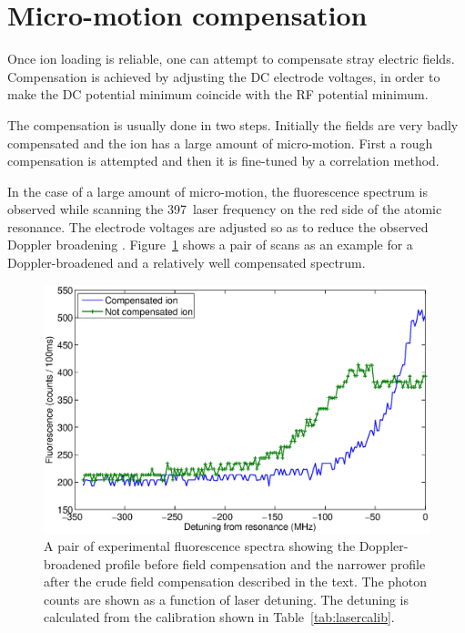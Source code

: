 \section{Micro-motion compensation}
\label{sec:micromotioncomp}

Once ion loading is reliable, one can attempt to compensate stray electric fields. Compensation is achieved by adjusting the DC electrode voltages, in order to make the DC potential minimum coincide with the RF potential minimum. 

The compensation is usually done in two steps. Initially the fields are very badly compensated and the ion has a large amount of micro-motion. First a rough compensation is attempted and then it is fine-tuned by a correlation method.

In the case of a large amount of micro-motion, the fluorescence spectrum is observed while scanning the 397\nm\, laser frequency on the red side of the atomic resonance. The electrode voltages are adjusted so as to reduce the observed  Doppler broadening \cite{Stevens1999}. Figure~\ref{fig:397compensationscans} shows a pair of scans as an example for a Doppler-broadened and a relatively well compensated spectrum. 

\begin{figure}[!ht]
\centering
\includegraphics[width=14.5cm]{chapter6/rfcorr/compensation397_2}
\caption[Fluorescence spectra before and after stray field compensation]{A pair of experimental fluorescence spectra showing the Doppler-broadened profile before field compensation and the narrower profile after the crude field compensation described in the text. The photon counts are shown as a function of laser detuning. The detuning is calculated from the calibration shown in Table~\ref{tab:lasercalib}. \cversion }
\label{fig:397compensationscans}
\end{figure} 


